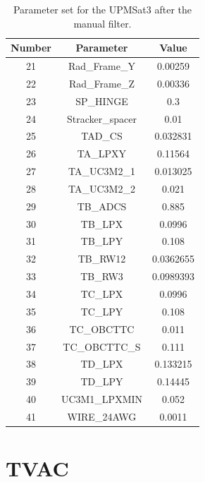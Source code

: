     \begin{table}[H]
        \centering
        \caption{Parameter set for the UPMSat3 after the manual filter.}
        \label{tab:manualfilterparamsUPMSat3}
    \begin{tabular}{ccc}
        \hline
        Number & Parameter & Value \\
        \hline
    21 & Rad\_Frame\_Y & 0.00259 \\
    22 & Rad\_Frame\_Z & 0.00336 \\
    23 & SP\_HINGE & 0.3 \\
    24 & Stracker\_spacer & 0.01 \\
    25 & TAD\_CS & 0.032831 \\
    26 & TA\_LPXY & 0.11564 \\
    27 & TA\_UC3M2\_1 & 0.013025 \\
    28 & TA\_UC3M2\_2 & 0.021 \\
    29 & TB\_ADCS & 0.885 \\
    30 & TB\_LPX & 0.0996 \\
    31 & TB\_LPY & 0.108 \\
    32 & TB\_RW12 & 0.0362655 \\
    33 & TB\_RW3 & 0.0989393 \\
    34 & TC\_LPX & 0.0996 \\
    35 & TC\_LPY & 0.108 \\
    36 & TC\_OBCTTC & 0.011 \\
    37 & TC\_OBCTTC\_S & 0.111 \\
    38 & TD\_LPX & 0.133215 \\
    39 & TD\_LPY & 0.14445 \\
    40 & UC3M1\_LPXMIN & 0.052   \\
    41 & WIRE\_24AWG & 0.0011  \\

    \bottomrule
    \end{tabular}
\end{table}

\section{TVAC}

